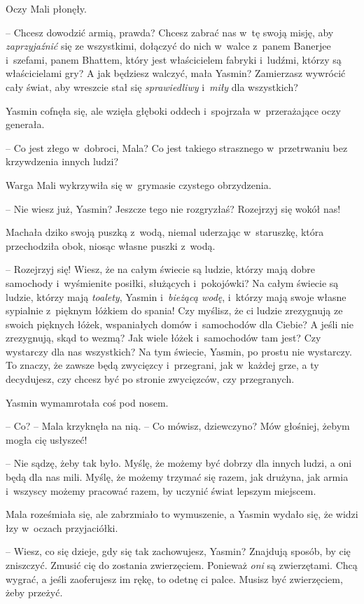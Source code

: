 \documentclass[oneside,polish,11pt,rmheadings]{mwbk}
\begin{document}
Oczy Mali płonęły. 

-- Chcesz dowodzić armią, prawda? Chcesz zabrać nas w~tę swoją misję, aby \textit{zaprzyjaźnić }się ze wszystkimi, dołączyć do nich w~walce z~panem Banerjee i~szefami, panem Bhattem, który jest właścicielem fabryki i~ludźmi, którzy są właścicielami gry? A jak będziesz walczyć, mała Yasmin? Zamierzasz wywrócić cały świat, aby wreszcie stał się \textit{sprawiedliwy } i~\textit{miły }dla wszystkich?

Yasmin cofnęła się, ale wzięła głęboki oddech i~spojrzała w~przerażające oczy generała. 

-- Co jest złego w~dobroci, Mala? Co jest takiego strasznego w~przetrwaniu bez krzywdzenia innych ludzi?

Warga Mali wykrzywiła się w~grymasie czystego obrzydzenia. 

-- Nie wiesz już, Yasmin? Jeszcze tego nie rozgryzłaś? Rozejrzyj się wokół nas! 

Machała dziko swoją puszką z~wodą, niemal uderzając w~staruszkę, która przechodziła obok, niosąc własne puszki z~wodą. 

-- Rozejrzyj się! Wiesz, że na całym świecie są ludzie, którzy mają dobre samochody i~wyśmienite posiłki, służących i~pokojówki? Na całym świecie są ludzie, którzy mają \textit{toalety}, Yasmin i~\textit{bieżącą wodę}, i~którzy mają swoje własne sypialnie z~pięknym łóżkiem do spania! Czy myślisz, że ci ludzie zrezygnują ze swoich pięknych łóżek, wspaniałych domów i~samochodów dla Ciebie? A jeśli nie zrezygnują, skąd to wezmą? Jak wiele łóżek i~samochodów tam jest? Czy wystarczy dla nas wszystkich? Na tym świecie, Yasmin, po prostu nie wystarczy. To znaczy, że zawsze będą zwycięzcy i~przegrani, jak w~każdej grze, a ty decydujesz, czy chcesz być po stronie zwycięzców, czy przegranych.

Yasmin wymamrotała coś pod nosem.

-- Co? -- Mala krzyknęła na nią. -- Co mówisz, dziewczyno? Mów głośniej, żebym mogła cię usłyszeć!

-- Nie sądzę, żeby tak było. Myślę, że możemy być dobrzy dla innych ludzi, a oni będą dla nas mili. Myślę, że możemy trzymać się razem, jak drużyna, jak armia i~wszyscy możemy pracować razem, by uczynić świat lepszym miejscem.

Mala roześmiała się, ale zabrzmiało to wymuszenie, a Yasmin wydało się, że widzi łzy w~oczach przyjaciółki. 

-- Wiesz, co się dzieje, gdy się tak zachowujesz, Yasmin? Znajdują sposób, by cię zniszczyć. Zmusić cię do zostania zwierzęciem. Ponieważ \textit{oni} są zwierzętami. Chcą wygrać, a jeśli zaoferujesz im rękę, to odetnę ci palce. Musisz być zwierzęciem, żeby przeżyć.
\end{document}
